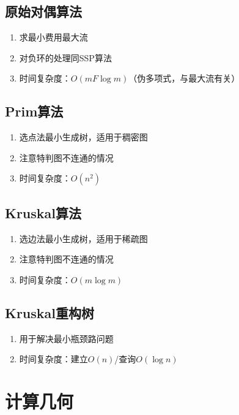\documentclass[twocolumn,a4,8pt]{article}  %
\begin{document}
		\subsection{原始对偶算法}
			\noindent\begin{enumerate}
				\item 求最小费用最大流
				\item 对负环的处理同SSP算法
				\item 时间复杂度：$O(mF\log m)$（伪多项式，与最大流有关）
			\end{enumerate}
	 	 	
	 	 	
		\subsection{Prim算法}
			\noindent\begin{enumerate}
				\item 选点法最小生成树，适用于稠密图
				\item 注意特判图不连通的情况
				\item 时间复杂度：$O(n^2)$
			\end{enumerate}
	 	 	
	 	 	
		\subsection{Kruskal算法}
			\noindent\begin{enumerate}
				\item 选边法最小生成树，适用于稀疏图
				\item 注意特判图不连通的情况
				\item 时间复杂度：$O(m\log m)$
			\end{enumerate}
	 	 	
	 	 	
		\subsection{Kruskal重构树}
			\noindent\begin{enumerate}
				\item 用于解决最小瓶颈路问题
				\item 时间复杂度：建立$O(n)$/查询$O(\log n)$
			\end{enumerate}
	 	 	
	 	 	
	\section{计算几何}
\end{document}
